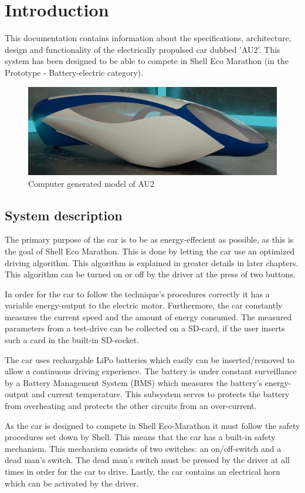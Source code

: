 \chapter{Introduction}
This documentation contains information about the specifications, architecture, design and functionality of the electrically propulsed car dubbed 'AU2'. This system has been designed to be able to compete in Shell Eco Marathon (in the Prototype - Battery-electric category).

\begin{figure}[H]
	\centering
	\includegraphics[width=0.6\linewidth]{Introduction/Model}
	\caption{Computer generated model of AU2}
	\label{fig:System_model}
\end{figure}

\section{System description}

The primary purpose of the car is to be as energy-effecient as possible, as this is the goal of Shell Eco Marathon. This is done by letting the car use an optimized driving algorithm. This algorithm is explained in greater details in later chapters. This algorithm can be turned on or off by the driver at the press of two buttons.

In order for the car to follow the technique's procedures correctly it has a variable energy-output to the electric motor. Furthermore, the car constantly measures the current speed and the amount of energy consumed. The measured parameters from a test-drive can be collected on a SD-card, if the user inserts such a card in the built-in SD-socket.

The car uses rechargable LiPo batteries which easily can be inserted/removed to allow a continuous driving experience. The battery is under constant surveillance by a Battery Management System (BMS) which measures the battery's energy-output and current temperature. This subsystem serves to protects the battery from overheating and protects the other circuits from an over-current.

As the car is designed to compete in Shell Eco-Marathon it must follow the safety procedures set down by Shell. This means that the car has a built-in safety mechanism. This mechanism consists of two switches: an on/off-switch and a dead man's switch. The dead man's switch must be pressed by the driver at all times in order for the car to drive. Lastly, the car contains an electrical horn which can be activated by the driver.

